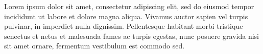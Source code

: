 \documentclass[11pt]{article}
\begin{document}

\vspace{1em}

Lorem ipsum dolor sit amet, consectetur adipiscing elit, sed do eiusmod tempor incididunt ut labore et dolore magna aliqua. 
Vivamus auctor sapien vel turpis pulvinar, in imperdiet nulla dignissim. 
Pellentesque habitant morbi tristique senectus et netus et malesuada fames ac turpis egestas, nunc posuere gravida nisi sit amet ornare, fermentum vestibulum est commodo sed.
\vspace{1em}



\vspace{0.5em}




\vspace{1em}



\end{document}

